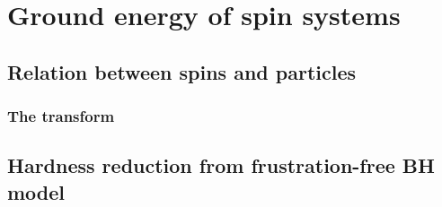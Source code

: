 \documentclass[../thesis-main/thesis-main]{subfiles}
\begin{document}
\chapter{Ground energy of spin systems}

\section{Relation between spins and particles}

\subsection{The transform}

\section{Hardness reduction from frustration-free BH model}
\end{document}
